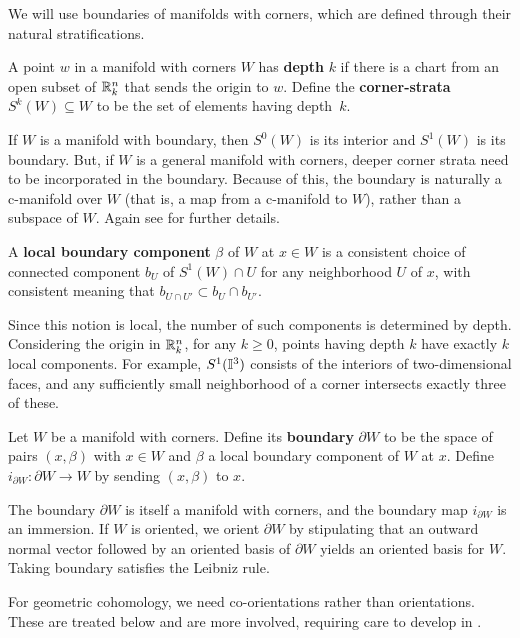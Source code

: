 We will use boundaries of manifolds with corners, which are defined through their natural stratifications.

\begin{definition}
	A point $w$ in a manifold with corners $W$ has \textbf{depth} $k$ if there is a chart from an open subset of $\mathbb{R}^n_k$ that sends the origin to $w$.
	Define the {\bf corner-strata} $S^k(W) \subseteq W$ to be the set of elements having depth~$k$.
\end{definition}

If $W$ is a manifold with boundary, then $S^0(W)$ is its interior and $S^1(W)$ is its boundary.
But, if $W$ is a general manifold with corners, deeper corner strata need to be incorporated in the boundary.
Because of this, the boundary is naturally a c-manifold over $W$ (that is, a map from a c-manifold to $W$), rather than a subspace of $W$.
Again see \cite[Section 2]{Joy12} for further details.

\begin{definition}
	A \textbf{local boundary component} $\beta$ of $W$ at $x \in W$ is a consistent choice of connected component $b_U$ of $S^1(W) \cap U$ for any neighborhood $U$ of $x$, with consistent meaning that $b_{U \cap U'} \subset b_{U} \cap b_{U'}$.
\end{definition}

Since this notion is local, the number of such components is determined by depth.
Considering the origin in $\mathbb{R}^n_k$, for any $k \geq 0$, points having depth $k$ have exactly $k$ local components.
For example, $S^1(\mathbb{I}^3)$ consists of the interiors of two-dimensional faces, and any sufficiently small neighborhood of a corner intersects exactly three of these.

\begin{definition}
	Let $W$ be a manifold with corners. Define its {\bf boundary} $\partial W$ to be the space of pairs $(x, \beta)$ with $x \in W$ and $\beta$ a local boundary component of $W$ at $x$.
	Define $i_{\partial W} \colon \partial W \to W$ by sending $(x,\beta)$ to $x$.
\end{definition}

The boundary $\partial W$ is itself a manifold with corners, and the boundary map $i_{\partial W}$ is an immersion.
If $W$ is oriented, we orient $\partial W$ by stipulating that an outward normal vector followed by an oriented basis of $\partial W$ yields an oriented basis for $W$.
Taking boundary satisfies the Leibniz rule.

For geometric cohomology, we need co-orientations rather than orientations.
These are treated below and are more involved, requiring care to develop in \cite{medina2022foundations}.

